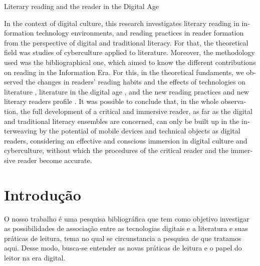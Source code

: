 \begin{refsection}
    
    \begin{otherlanguage}{english}
    
    \fakeChapterOneLine
    {Literary reading and the reader in the Digital Age}
    
    \begin{galoResumo}[Abstract]
        In the context of digital culture, this research investigates literary reading in information technology environments, and reading practices in reader formation from the perspective of digital and traditional literacy. For that, the theoretical field was studies of cyberculture applied to literature. Moreover, the methodology used was the bibliographical one, which aimed to know the different contributions on reading in the Information Era. For this, in the theoretical fundaments, we observed the changes in readers' reading habits and the effects of technologies on literature \cite{Ong1996Oralidad, Levy1999Cibercultura, Marcuschi2001Hipertexto}, literature in the digital age \cite{Xavier2009Era, Almeida2005Letramento}, and the new reading practices and new literary readers profile \cite{Prensky2001Nativos, Santaella2004Navegar}. It was possible to conclude that, in the whole observation, the full development of a critical and immersive reader, as far as the digital and traditional literacy ensembles are concerned, can only be built up in the interweaving by the potential of mobile devices and technical objects as digital readers, considering an effective and conscious immersion in digital culture and cyberculture, without which the procedures of the critical reader and the immersive reader become accurate. 
    \end{galoResumo}
    
    \end{otherlanguage}
    
    
    \section{Introdução}

    O nosso trabalho é uma pesquisa bibliográfica que tem como objetivo investigar as possibilidades de associação entre as tecnologias digitais e a literatura e suas práticas de leitura, tema no qual se circunstancia a pesquisa de que tratamos aqui. Desse modo, busca-se entender as novas práticas de leitura e o papel do leitor na era digital. 


\end{refsection}
